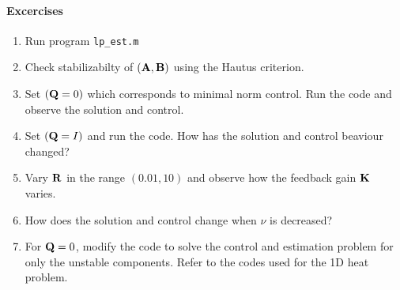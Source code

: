 \documentclass[12pt]{article}
\begin{document}
\paragraph{Excercises}

\begin{enumerate}

\item Run program {\tt lp\_est.m}

\item Check stabilizabilty of $({\mathbf A},{\mathbf B})$ using the Hautus criterion.

\item Set $({\mathbf Q} = 0)$ which corresponds to minimal norm control. Run the code and observe the solution and control.

\item Set $({\mathbf Q} = I)$ and run the code. How has the solution and control beaviour changed?

\item Vary ${\mathbf R}$ in the range $(0.01,10)$ and observe how the feedback gain ${\mathbf K}$ varies.

\item How does the solution and control change when $\nu$ is decreased?

\item For ${\mathbf Q} = 0$, modify the code to solve the control and estimation problem for only the unstable components. Refer to the codes used for the 1D heat problem.
\end{enumerate}


\end{document}
